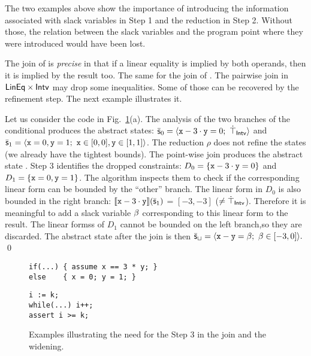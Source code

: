\documentclass[sttt]{svjour}
\begin{document}
The two examples above show the importance of introducing the information associated with slack variables in Step 1 and the reduction in Step 2.
Without those, the relation between the slack variables and the program point where they were introduced would have been lost.



The join of \Lineq{} is \emph{precise} in that if a linear equality is implied by both operands, then it is implied by the result too.
The same for the join of \Intervals.
The pairwise join in $\mathsf{LinEq} \times \mathsf{Intv}$ may drop some inequalities.
Some of those can be recovered by the refinement step.
The next example illustrates it.


\begin{example}[Step 3]
Let us consider the code in Fig.~\ref{ex:joinwiden}(a).
The analysis of the two branches of the conditional  produces the abstract states: 
\(
\bar{\mathsf{\mathsf{s}}}_0  = \langle \mathtt{x} - 3 \cdot \mathtt{y} = 0;\ \dot\top_{\mathsf{Intv}} \rangle 
\) 
and
\(
\subpoly_1  =\tupla{\code{x} = 0, \code{y} = 1;\ \code{x} \in [0,0], \code{y} \in [1,1] }
\).
The reduction $\rho$ does not refine the states (we already have the tightest bounds).
The point-wise join produces the abstract state \topS.
Step 3 identifies the dropped constraints: $D_0 = \{\mathtt{x} - 3 \cdot \mathtt{y} = 0\}$ and $D_1 = \{\mathtt{x} = 0, \mathtt{y} = 1 \}$.
The algorithm  inspects them to check if the corresponding linear form can be bounded by the ``other'' branch.
The linear form in $D_0$  is also bounded in the right branch: $\llbracket \mathtt{\mathtt{x} - \mathrm{3} \cdot \mathtt{y}} \rrbracket(\bar{\mathsf{\mathsf{s}}}_1)$ = $[-3,-3]$ ($\neq \dot\top_{\mathsf{Intv}}$).
Therefore it is meaningful to add a slack variable $\beta_{}$ corresponding to this linear form to the result.
The linear formss of $D_1$ cannot be bounded on the left branch,so they are discarded. 
The abstract state after the join is then
\(
\bar{\mathsf{\mathsf{s}}}_\sqcup =\langle \mathtt{x} - \mathtt{y} = \beta_{};\ \beta_{} \in [-3,0]  \rangle.
\) \qed
\end{example}

\begin{figure}%
\centering
  \begin{subfloat}
    \begin{minipage}{5cm}
\begin{verbatim}
if(...) { assume x == 3 * y; } 
else    { x = 0; y = 1; }
\end{verbatim}
    \end{minipage}
    \caption{}
  \end{subfloat}    
  \qquad 
  \begin{subfloat}
    \begin{minipage}{2.5cm}
\begin{verbatim}
i := k;
while(...) i++;
assert i >= k;
\end{verbatim}
    \end{minipage}
    \caption{}
  \end{subfloat}
\caption{Examples illustrating the need for the Step 3 in the join and the widening.}
\label{ex:joinwiden}
\end{figure}
\end{document}
